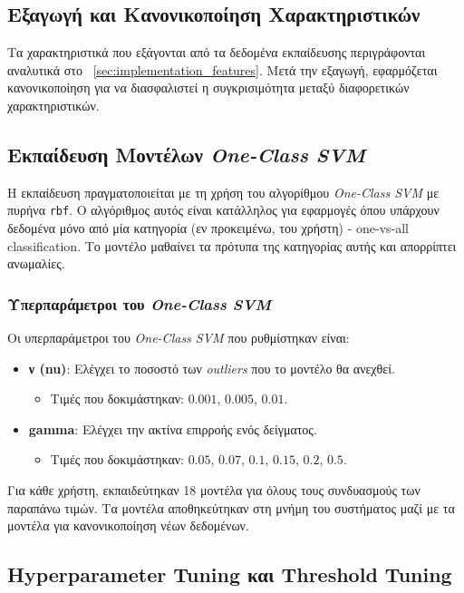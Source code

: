 \subsection{Εξαγωγή και Κανονικοποίηση Χαρακτηριστικών}

Τα χαρακτηριστικά που εξάγονται από τα δεδομένα εκπαίδευσης περιγράφονται αναλυτικά στο ~\autoref{sec:implementation_features}. Μετά την εξαγωγή, εφαρμόζεται κανονικοποίηση για να διασφαλιστεί η συγκρισιμότητα μεταξύ διαφορετικών χαρακτηριστικών.

\subsection{Εκπαίδευση Μοντέλων \textit{One-Class SVM}}

Η εκπαίδευση πραγματοποιείται με τη χρήση του αλγορίθμου \textit{One-Class SVM} με πυρήνα \texttt{rbf}. Ο αλγόριθμος αυτός είναι κατάλληλος για εφαρμογές όπου υπάρχουν δεδομένα μόνο από μία κατηγορία (εν προκειμένω, του χρήστη) - one-vs-all classification. Το μοντέλο μαθαίνει τα πρότυπα της κατηγορίας αυτής και απορρίπτει ανωμαλίες.

\subsubsection{Υπερπαράμετροι του \textit{One-Class SVM}}

Οι υπερπαράμετροι του \textit{One-Class SVM} που ρυθμίστηκαν είναι:
\begin{itemize}
    \item \textbf{ν (nu)}: Ελέγχει το ποσοστό των \textit{outliers} που το μοντέλο θα ανεχθεί.
    \begin{itemize}
        \item Τιμές που δοκιμάστηκαν: $0.001$, $0.005$, $0.01$.
    \end{itemize}
    \item \textbf{gamma}: Ελέγχει την ακτίνα επιρροής ενός δείγματος.
    \begin{itemize}
        \item Τιμές που δοκιμάστηκαν: $0.05$, $0.07$, $0.1$, $0.15$, $0.2$, $0.5$.
    \end{itemize}
\end{itemize}

Για κάθε χρήστη, εκπαιδεύτηκαν 18 μοντέλα για όλους τους συνδυασμούς των παραπάνω τιμών. Τα μοντέλα αποθηκεύτηκαν στη μνήμη του συστήματος μαζί με τα μοντέλα για κανονικοποίηση νέων δεδομένων.

\subsection{Hyperparameter Tuning και Threshold Tuning}

